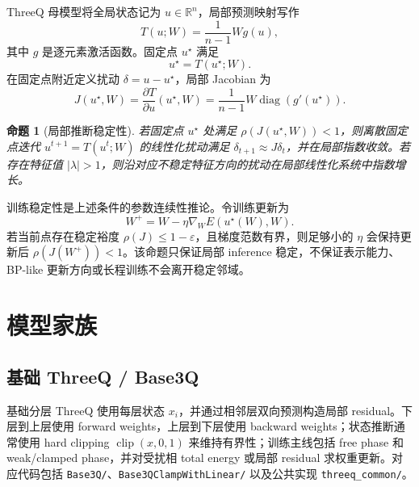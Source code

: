 \documentclass[UTF8,zihao=-4]{ctexart}
\newtheorem{proposition}{命题}
\begin{document}
        ThreeQ 母模型将全局状态记为 $u\in\mathbb{R}^n$，局部预测映射写作
        \begin{equation}
        T(u;W)=\frac{1}{n-1}Wg(u),
        \end{equation}
        其中 $g$ 是逐元素激活函数。固定点 $u^\star$ 满足
        \begin{equation}
        u^\star=T(u^\star;W).
        \end{equation}
        在固定点附近定义扰动 $\delta=u-u^\star$，局部 Jacobian 为
        \begin{equation}
        J(u^\star,W)=\frac{\partial T}{\partial u}(u^\star,W)
        =\frac{1}{n-1}W\operatorname{diag}(g'(u^\star)).
        \end{equation}

        \begin{proposition}[局部推断稳定性]
        若固定点 $u^\star$ 处满足 $\rho(J(u^\star,W))<1$，则离散固定点迭代 $u^{t+1}=T(u^t;W)$ 的线性化扰动满足 $\delta_{t+1}\approx J\delta_t$，并在局部指数收敛。若存在特征值 $|\lambda|>1$，则沿对应不稳定特征方向的扰动在局部线性化系统中指数增长。
        \end{proposition}

        训练稳定性是上述条件的参数连续性推论。令训练更新为
        \begin{equation}
        W^+=W-\eta \nabla_W E(u^\star(W),W).
        \end{equation}
        若当前点存在稳定裕度 $\rho(J)\le 1-\varepsilon$，且梯度范数有界，则足够小的 $\eta$ 会保持更新后 $\rho(J(W^+))<1$。该命题只保证局部 inference 稳定，不保证表示能力、BP-like 更新方向或长程训练不会离开稳定邻域。

        \section{模型家族}

        \subsection{基础 ThreeQ / Base3Q}

        基础分层 ThreeQ 使用每层状态 $x_i$，并通过相邻层双向预测构造局部 residual。下层到上层使用 forward weights，上层到下层使用 backward weights；状态推断通常使用 hard clipping $\operatorname{clip}(x,0,1)$ 来维持有界性；训练主线包括 free phase 和 weak/clamped phase，并对受扰相 total energy 或局部 residual 求权重更新。对应代码包括 \texttt{Base3Q/}、\texttt{Base3QClampWithLinear/} 以及公共实现 \texttt{threeq\_common/}。
\end{document}

